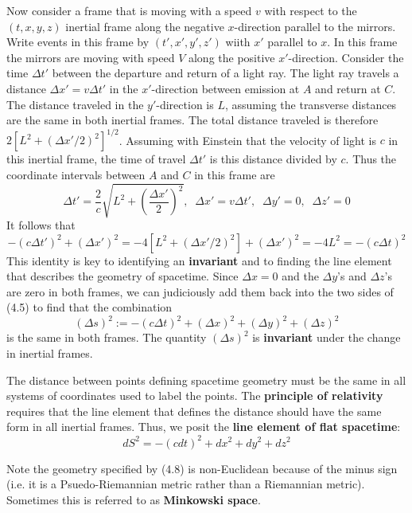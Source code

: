 Now consider a frame that is moving with a speed $v$ with respect to the $(t,x,y,z)$ inertial frame along the negative $x$-direction parallel to the mirrors. Write events in this frame by $(t',x',y',z')$ wiith $x'$ parallel to $x$. In this frame the mirrors are moving with speed $V$ along the positive $x'$-direction. Consider the time $\Delta t'$ between the departure and return of a light ray. The light ray travels a distance $\Delta x' = v\Delta t'$ in the $x'$-direction between emission at $A$ and return at $C$. The distance traveled in the $y'$-direction is $L$, assuming the transverse distances are the same in both inertial frames. The total distance traveled is therefore $2[L^2+(\Delta x'/2)^2]^{1/2}$. Assuming with Einstein that the velocity of light is $c$ in this inertial frame, the time of travel $\Delta t'$ is this distance divided by $c$. Thus the coordinate intervals between $A$ and $C$ in this frame are $$\Delta t' = \frac{2}{c}\sqrt{L^2+\left(\frac{\Delta x'}{2}\right)^2},\;\;\Delta x' = v\Delta t',\;\;\Delta y' = 0,\;\;\Delta z' = 0$$
It follows that $$-(c\Delta t')^2+(\Delta x')^2 = -4[L^2+(\Delta x'/2)^2]+(\Delta x')^2 = -4L^2 = -(c\Delta t)^2$$
This identity is key to identifying an \textbf{invariant} and to finding the line element that describes the geometry of spacetime. Since $\Delta x = 0$ and the $\Delta y$'s and $\Delta z$'s are zero in both frames, we can judiciously add them back into the two sides of (4.5) to find that the combination \begin{equation*}
    \boxed{(\Delta s)^2 := -(c\Delta t)^2+(\Delta x)^2+(\Delta y)^2+(\Delta z)^2}
\end{equation*}
is the same in both frames. The quantity $(\Delta s)^2$ is \textbf{invariant} under the change in inertial frames.

\begin{rmk}
    The distance between points defining spacetime geometry must be the same in all systems of coordinates used to label the points. The \textbf{principle of relativity} requires that the line element that defines the distance should have the same form in all inertial frames. Thus, we posit the \textbf{line element of flat spacetime}: \begin{equation}
        \boxed{dS^2 = -(cdt)^2+dx^2+dy^2+dz^2}
    \end{equation}
\end{rmk}
Note the geometry specified by (4.8) is non-Euclidean because of the minus sign (i.e. it is a Psuedo-Riemannian metric rather than a Riemannian metric). Sometimes this is referred to as \textbf{Minkowski space}.


